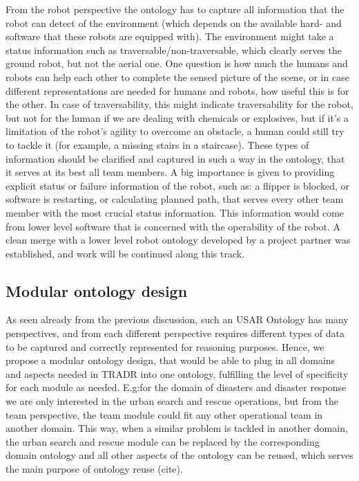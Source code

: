 \begin{itemize}
\begin{itemize}
From the robot perspective the ontology has to capture all information that the robot can detect of the environment (which depends on the available hard- and software that these robots are equipped with). The environment might take a status information such as traversable/non-traversable, which clearly serves the ground robot, but not the aerial one. One question is how much the humans and robots can help each other to complete the sensed picture of the scene, or in case different representations are needed for humans and robots, how useful this is for the other. In case of traversability, this might indicate traversability for the robot, but not for the human if we are dealing with chemicals or explosives, but if it's a limitation of the robot's agility to overcome an obstacle, a human could still try to tackle it (for example, a missing stairs in a staircase). These types of information should be clarified and captured in such a way in the ontology, that it serves at its best all team members.
A big importance is given to providing explicit status or failure information of the robot, such as: a flipper is blocked, or software is restarting, or calculating planned path, that serves every other team member with the most crucial status information. This information would come from lower level software that is concerned with the operability of the robot. A clean merge with a lower level robot ontology developed by a project partner was established, and work will be continued along this track.
\end{itemize}
\end{itemize}


\subsection{Modular ontology design}

As seen already from the previous discussion, such an USAR Ontology has many perspectives, and from each different perspective requires different types of data to be captured and correctly represented for reasoning purposes. Hence, we propose a modular ontology design, that would be able to plug in all domains and aspects needed in TRADR into one ontology, fulfilling the level of specificity for each module as needed. E.g:for the domain of disasters and disaster response we are only interested in the urban search and rescue operations, but from the team perspective, the team module could fit any other operational team in another domain. This way, when a similar problem is tackled in another domain, the urban search and rescue module can be replaced by the corresponding domain ontology and all other aspects of the ontology can be reused, which serves the main purpose of ontology reuse (cite).


